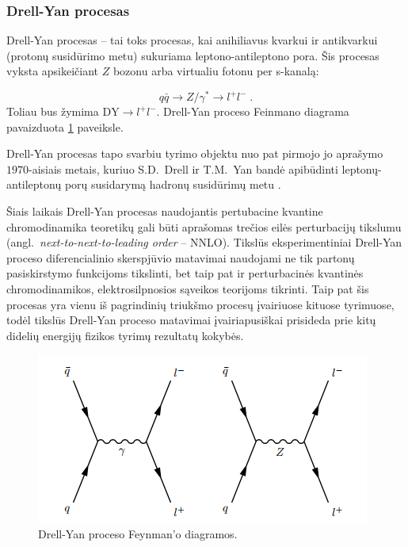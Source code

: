\documentclass[a4paper, 12pt]{article}
\newcommand{\DY}{\mathrm{DY}}
\newlength\q
\begin{document}
\begin{centering}
\begin{minipage}[t]{0.48\linewidth}
\end{minipage}
\vspace{-0.3cm}
\end{centering}


\subsubsection{Drell-Yan procesas}

Drell-Yan procesas -- tai toks procesas, kai anihiliavus kvarkui ir antikvarkui (protonų susidūrimo
metu) sukuriama leptono-antileptono pora.
Šis procesas vyksta apsikeičiant $Z$ bozonu arba
virtualiu fotonu per s-kanalą:

\begin{equation*}
	q\bar{q} \rightarrow Z/ \gamma^{*} \rightarrow l^{+}l^{-} \; .
\end{equation*}
Toliau bus žymima $\DY \! \rightarrow \! l^{+}l^{-}$. Drell-Yan proceso Feinmano diagrama
pavaizduota \ref{fig:DYfeyn} paveiksle.

Drell-Yan procesas tapo svarbiu tyrimo objektu nuo pat pirmojo jo aprašymo $1970$-aisiais
metais, kuriuo S.D.\ Drell ir T.M.\ Yan bandė apibūdinti leptonų-antileptonų porų susidarymą
hadronų susidūrimų metu \cite{DYoriginal}.

Šiais laikais Drell-Yan procesas naudojantis pertubacine kvantine chromodinamika teoretikų
gali būti aprašomas trečios eilės perturbacijų tikslumu (angl.\ \textit{next-to-next-to-leading
order} -- NNLO).
Tikslūs eksperimentiniai Drell-Yan proceso diferencialinio skerspjūvio matavimai naudojami
ne tik partonų pasiskirstymo funkcijoms tikslinti, bet taip pat ir perturbacinės kvantinės
chromodinamikos, elektrosilpnosios sąveikos teorijoms tikrinti. Taip pat šis procesas yra vienu iš
pagrindinių triukšmo procesų įvairiuose kituose tyrimuose, todėl tikslūs Drell-Yan proceso matavimai
įvairiapusiškai prisideda prie kitų didelių energijų fizikos tyrimų rezultatų kokybės.

\begin{figure}[H]
\centering
\includegraphics[scale=0.75]{DYprocess.PNG}
\caption{Drell-Yan proceso Feynman'o diagramos.}
\label{fig:DYfeyn}
\end{figure}
\end{document}
